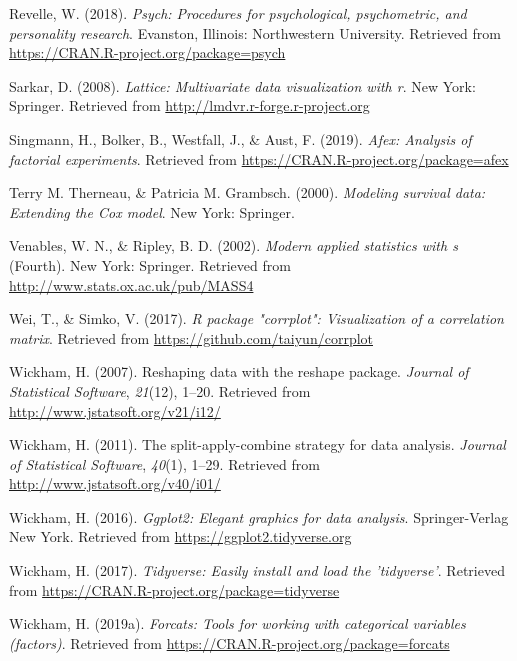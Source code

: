\documentclass[man]{apa6}
\begin{document}
\leavevmode\hypertarget{ref-R-psych}{}%
Revelle, W. (2018). \emph{Psych: Procedures for psychological, psychometric, and personality research}. Evanston, Illinois: Northwestern University. Retrieved from \url{https://CRAN.R-project.org/package=psych}

\leavevmode\hypertarget{ref-R-lattice}{}%
Sarkar, D. (2008). \emph{Lattice: Multivariate data visualization with r}. New York: Springer. Retrieved from \url{http://lmdvr.r-forge.r-project.org}

\leavevmode\hypertarget{ref-R-afex}{}%
Singmann, H., Bolker, B., Westfall, J., \& Aust, F. (2019). \emph{Afex: Analysis of factorial experiments}. Retrieved from \url{https://CRAN.R-project.org/package=afex}

\leavevmode\hypertarget{ref-R-survival-book}{}%
Terry M. Therneau, \& Patricia M. Grambsch. (2000). \emph{Modeling survival data: Extending the Cox model}. New York: Springer.

\leavevmode\hypertarget{ref-R-MASS}{}%
Venables, W. N., \& Ripley, B. D. (2002). \emph{Modern applied statistics with s} (Fourth). New York: Springer. Retrieved from \url{http://www.stats.ox.ac.uk/pub/MASS4}

\leavevmode\hypertarget{ref-R-corrplot2017}{}%
Wei, T., \& Simko, V. (2017). \emph{R package "corrplot": Visualization of a correlation matrix}. Retrieved from \url{https://github.com/taiyun/corrplot}

\leavevmode\hypertarget{ref-R-reshape2}{}%
Wickham, H. (2007). Reshaping data with the reshape package. \emph{Journal of Statistical Software}, \emph{21}(12), 1--20. Retrieved from \url{http://www.jstatsoft.org/v21/i12/}

\leavevmode\hypertarget{ref-R-plyr}{}%
Wickham, H. (2011). The split-apply-combine strategy for data analysis. \emph{Journal of Statistical Software}, \emph{40}(1), 1--29. Retrieved from \url{http://www.jstatsoft.org/v40/i01/}

\leavevmode\hypertarget{ref-R-ggplot2}{}%
Wickham, H. (2016). \emph{Ggplot2: Elegant graphics for data analysis}. Springer-Verlag New York. Retrieved from \url{https://ggplot2.tidyverse.org}

\leavevmode\hypertarget{ref-R-tidyverse}{}%
Wickham, H. (2017). \emph{Tidyverse: Easily install and load the 'tidyverse'}. Retrieved from \url{https://CRAN.R-project.org/package=tidyverse}

\leavevmode\hypertarget{ref-R-forcats}{}%
Wickham, H. (2019a). \emph{Forcats: Tools for working with categorical variables (factors)}. Retrieved from \url{https://CRAN.R-project.org/package=forcats}
\end{document}

